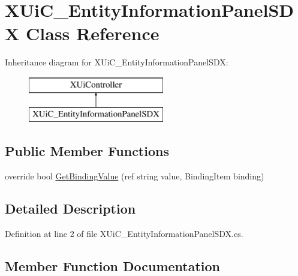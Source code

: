 \hypertarget{class_x_ui_c___entity_information_panel_s_d_x}{}\section{X\+Ui\+C\+\_\+\+Entity\+Information\+Panel\+S\+DX Class Reference}
\label{class_x_ui_c___entity_information_panel_s_d_x}
Inheritance diagram for X\+Ui\+C\+\_\+\+Entity\+Information\+Panel\+S\+DX\+:\begin{figure}[H]
\begin{center}
\leavevmode
\includegraphics[height=2.000000cm]{class_x_ui_c___entity_information_panel_s_d_x}
\end{center}
\end{figure}
\subsection*{Public Member Functions}
\begin{DoxyCompactItemize}
\item 
override bool \mbox{\hyperlink{class_x_ui_c___entity_information_panel_s_d_x_af38693b5832bb3faff38aac2e7e27650}{Get\+Binding\+Value}} (ref string value, Binding\+Item binding)
\end{DoxyCompactItemize}


\subsection{Detailed Description}


Definition at line 2 of file X\+Ui\+C\+\_\+\+Entity\+Information\+Panel\+S\+D\+X.\+cs.



\subsection{Member Function Documentation}
\mbox{\label{class_x_ui_c___entity_information_panel_s_d_x_af38693b5832bb3faff38aac2e7e27650}} 

